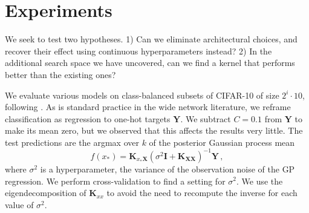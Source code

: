 \documentclass[tablecaption=bottom,wcp,nonatbib]{jmlr} %
\newcommand{\vX}{\mathbf{X}}
\newcommand{\vQ}{\mathbf{Q}}
\newcommand{\vK}{\mathbf{K}}
\newcommand{\vY}{\mathbf{Y}}
\newcommand{\vLambda}{\boldsymbol{\Lambda}}
\newcommand{\eye}{\mathbf{I}}
\newcommand{\tp}{{\mathrm{\textsf{\tiny T}}}}
\newcommand{\bracket}[3]{{\left#1 #3 \right#2}}
\newcommand{\bra}{\bracket{(}{)}}
\newcommand{\indicator}[1]{{\mathds{1}}\left[#1\right]}
\begin{document}
\section{Experiments}
We seek to test two hypotheses. 1) Can we eliminate architectural choices, and
recover their effect using continuous hyperparameters instead? 
2) In the additional search space we have uncovered, can we find a kernel that
performs better than the existing ones?

We evaluate various models on class-balanced subsets of CIFAR-10 of size $2^i \cdot 10$, following \citet{arora2020small}. As is
standard practice in the wide network literature, we reframe classification as
regression to one-hot targets $\vY$. %
We subtract $C=0.1$ from $\vY$ to make its mean zero, but we observed that this affects the results very little. The test
predictions are the argmax over $k$ of the posterior Gaussian process mean
\begin{equation}f(x_*) = \vK_{x_* \vX}\bra{\sigma^2\eye + \vK_{\vX\vX}}^{-1}\vY\,, \label{eq:mean-gp}\end{equation} where
$\sigma^2$ is a hyperparameter, the variance of the observation noise of the GP regression. We perform cross-validation to find a setting for $\sigma^2$. We use the eigendecomposition of $\vK_{xx}$ to avoid the need to recompute the inverse for each value of $\sigma^2$.

\end{document}
